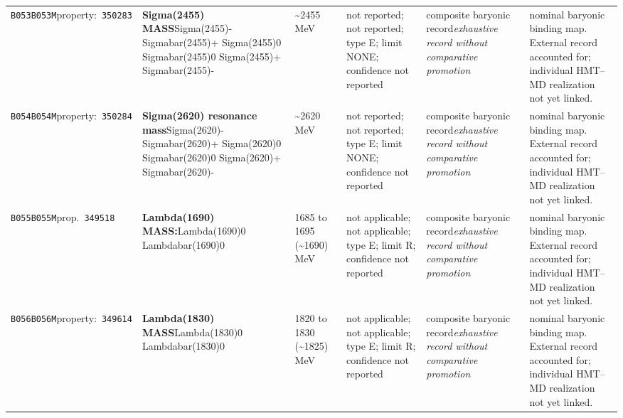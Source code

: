 \begin{landscape}
\begin{longtable}{L{1.85cm}L{4.45cm}L{2.35cm}L{4.05cm}L{3.35cm}L{7.15cm}}
\texttt{B053}\newline \texttt{B053M}\newline property:\ \texttt{350283} & \textbf{Sigma(2455) MASS}\newline Sigma(2455)- \textbar{}\allowbreak{} Sigmabar(2455)+ \textbar{}\allowbreak{} Sigma(2455)0 \textbar{}\allowbreak{} Sigmabar(2455)0 \textbar{}\allowbreak{} Sigma(2455)+ \textbar{}\allowbreak{} Sigmabar(2455)- & \textasciitilde{}2455\,MeV & not reported; not reported; type E; limit NONE; confidence not reported & composite baryonic record\newline \emph{exhaustive record without comparative promotion} & nominal baryonic binding map. External record accounted for; individual HMT--MD realization not yet linked. \\
\texttt{B054}\newline \texttt{B054M}\newline property:\ \texttt{350284} & \textbf{Sigma(2620) resonance mass}\newline Sigma(2620)- \textbar{}\allowbreak{} Sigmabar(2620)+ \textbar{}\allowbreak{} Sigma(2620)0 \textbar{}\allowbreak{} Sigmabar(2620)0 \textbar{}\allowbreak{} Sigma(2620)+ \textbar{}\allowbreak{} Sigmabar(2620)- & \textasciitilde{}2620\,MeV & not reported; not reported; type E; limit NONE; confidence not reported & composite baryonic record\newline \emph{exhaustive record without comparative promotion} & nominal baryonic binding map. External record accounted for; individual HMT--MD realization not yet linked. \\
\texttt{B055}\newline \texttt{B055M}\newline prop.\ \texttt{349518} & \textbf{Lambda(1690) MASS:}\newline Lambda(1690)0 \textbar{}\allowbreak{} Lambdabar(1690)0 & 1685 to 1695 (\textasciitilde{}1690)\,MeV & not applicable; not applicable; type E; limit R; confidence not reported & composite baryonic record\newline \emph{exhaustive record without comparative promotion} & nominal baryonic binding map. External record accounted for; individual HMT--MD realization not yet linked. \\
\texttt{B056}\newline \texttt{B056M}\newline property:\ \texttt{349614} & \textbf{Lambda(1830) MASS}\newline Lambda(1830)0 \textbar{}\allowbreak{} Lambdabar(1830)0 & 1820 to 1830 (\textasciitilde{}1825)\,MeV & not applicable; not applicable; type E; limit R; confidence not reported & composite baryonic record\newline \emph{exhaustive record without comparative promotion} & nominal baryonic binding map. External record accounted for; individual HMT--MD realization not yet linked. \\

\end{longtable}
\end{landscape}
